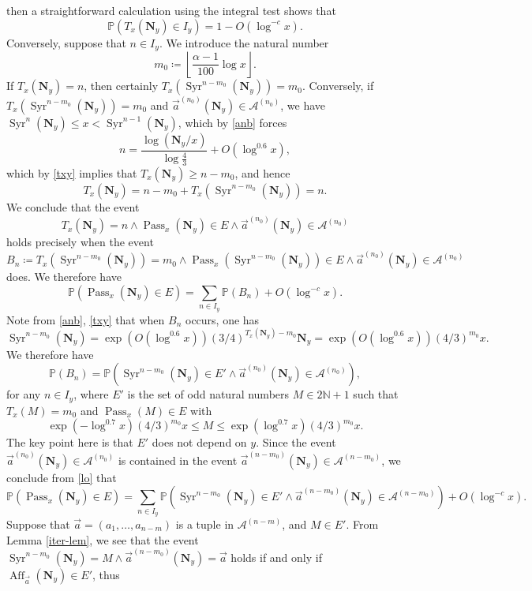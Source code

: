 \documentclass[12pt,a4paper,reqno]{amsart}
\numberwithin{equation}{section}
\theoremstyle{plain}
\theoremstyle{definition}
\renewcommand\P{\mathbb{P}}
\newcommand\N{\mathbb{N}}
\newcommand\Aff{{\operatorname{Aff}}}
\newcommand\Pass{{\operatorname{Pass}}}
\newcommand\Syr{{\operatorname{Syr}}}
\begin{document}
then a straightforward calculation using the integral test shows that
$$ \P( T_x(\mathbf{N}_y) \in I_y) = 1 - O( \log^{-c} x ).$$
Conversely, suppose that $n \in I_y$.  We introduce the natural number
\begin{equation}\label{mon}
 m_0 \coloneqq \left\lfloor \frac{\alpha-1}{100} \log x \right\rfloor.
\end{equation}
If $T_x(\mathbf{N}_y) = n$, then certainly $T_x( \Syr^{n-m_0}(\mathbf{N}_y) ) = m_0$.  Conversely, if $T_x( \Syr^{n-m_0}(\mathbf{N}_y) ) = m_0$ and $\vec a^{(n_0)}(\mathbf{N}_y) \in {\mathcal A}^{(n_0)}$, we have $\Syr^n(\mathbf{N}_y) \leq x < \Syr^{n-1}(\mathbf{N}_y)$, which by \eqref{anb} forces
$$ n = \frac{\log( \mathbf{N}_y / x )}{\log \frac{4}{3}} + O( \log^{0.6} x),$$
which by \eqref{txy} implies that $T_x(\mathbf{N}_y) \geq n - m_0$, and hence
$$ T_x(\mathbf{N}_y) = n - m_0 + T_x(\Syr^{n-m_0}(\mathbf{N}_y)) = n.$$
We conclude that the event 
$$T_x(\mathbf{N}_y) = n \wedge \Pass_x( \mathbf{N}_y ) \in E \wedge \vec a^{(n_0)}(\mathbf{N}_y) \in {\mathcal A}^{(n_0)}$$ 
holds precisely when the event
$$ B_n \coloneqq T_x( \Syr^{n-m_0}(\mathbf{N}_y) ) = m_0 \wedge \Pass_x(\Syr^{n-m_0}(\mathbf{N}_y)) \in E \wedge \vec a^{(n_0)}(\mathbf{N}_y) \in {\mathcal A}^{(n_0)}$$
does.  We therefore have 
$$
\P( \Pass_x( \mathbf{N}_y ) \in E )  =  \sum_{n \in I_y} \P(B_n)  +   O( \log^{-c} x  ).
$$
Note from \eqref{anb}, \eqref{txy} that when $B_n$ occurs, one has
$$ \Syr^{n-m_0}(\mathbf{N}_y) = \exp( O( \log^{0.6} x)) (3/4)^{T_x(\mathbf{N}_y)-m_0} \mathbf{N}_y = \exp( O( \log^{0.6} x)) (4/3)^{m_0} x.$$
We therefore have
$$  \P( B_n ) = \P( \Syr^{n-m_0}(\mathbf{N}_y) \in E' \wedge \vec a^{(n_0)}(\mathbf{N}_y) \in {\mathcal A}^{(n_0)} ),$$
for any $n \in I_y$, where $E'$ is the set of odd natural numbers $M \in 2\N+1$ such that $T_x(M) = m_0$ and $\Pass_x(M) \in E$ with
\begin{equation}\label{lost}
 \exp( - \log^{0.7} x ) (4/3)^{m_0} x \leq M \leq \exp( \log^{0.7} x ) (4/3)^{m_0} x.
\end{equation} 
The key point here is that $E'$ does not depend on $y$.  Since the event $\vec a^{(n_0)}(\mathbf{N}_y) \in {\mathcal A}^{(n_0)}$ is contained in the event $\vec a^{(n-m_0)}(\mathbf{N}_y) \in {\mathcal A}^{(n-m_0)}$, we conclude from \eqref{lo} that
$$  \P( \Pass_x( \mathbf{N}_y ) \in E )  =  \sum_{n \in I_y} \P( \Syr^{n-m_0}(\mathbf{N}_y) \in E' \wedge \vec a^{(n-m_0)}(\mathbf{N}_y) \in {\mathcal A}^{(n-m_0)} ) +   O( \log^{-c} x  ).$$
Suppose that $\vec a = (a_1,\dots,a_{n-m})$ is a tuple in ${\mathcal A}^{(n-m)}$, and $M \in E'$.  From Lemma \ref{iter-lem}, we see that the event $\Syr^{n-m_0}(\mathbf{N}_y) = M \wedge \vec a^{(n-m_0)}(\mathbf{N}_y) = \vec a$ holds if and only if $\Aff_{\vec a}( \mathbf{N}_y) \in E'$, thus
\end{document}
